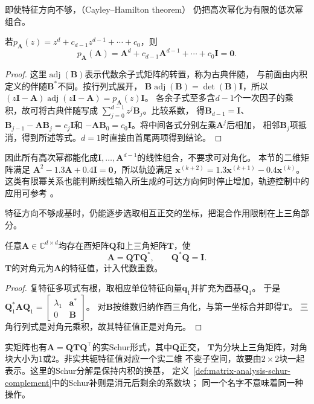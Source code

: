 即使特征方向不够，（Cayley--Hamilton theorem）
仍把高次幂化为有限的低次幂组合。
\begin{theorem}
若$p_{\bm A}(z)=z^d+c_{d-1}z^{d-1}+\cdots+c_0$，则
\[
 p_{\bm A}(\bm A)
 =\bm A^d+c_{d-1}\bm A^{d-1}+\cdots+c_0\bm I=\bm0.
\]
\end{theorem}
\begin{proof}
这里$\operatorname{adj}(\bm B)$表示代数余子式矩阵的转置，称为古典伴随，
与前面由内积定义的伴随$\bm B^*$不同。按行列式展开，
$\bm B\operatorname{adj}(\bm B)=\det(\bm B)\bm I$，所以
$(z\bm I-\bm A)\operatorname{adj}(z\bm I-\bm A)=p_{\bm A}(z)\bm I$。
各余子式至多含$d-1$个一次因子的乘积，故可将古典伴随写成
$\sum_{j=0}^{d-1}z^j\bm B_j$。比较系数，
得$\bm B_{d-1}=\bm I$、
$\bm B_{j-1}-\bm A\bm B_j=c_j\bm I$和
$-\bm A\bm B_0=c_0\bm I$。将中间各式分别左乘$\bm A^j$后相加，
相邻$\bm B_j$项抵消，得到所述等式。$d=1$时直接由首尾两项得到结论。
\end{proof}
因此所有高次幂都能化成$\bm I,\ldots,\bm A^{d-1}$的线性组合，不要求可对角化。
本节的二维矩阵满足
$\bm A^2-1.3\bm A+0.4\bm I=\bm0$，所以轨迹满足
$\bm x^{(k+2)}=1.3\bm x^{(k+1)}-0.4\bm x^{(k)}$。
这类有限幂关系也能判断线性输入所生成的可达方向何时停止增加，轨迹控制中的应用可参考
。


特征方向不够成基时，仍能逐步选取相互正交的坐标，把混合作用限制在上三角部分。
\begin{theorem}[复Schur分解]
任意$\bm A\in\mathbb C^{d\times d}$均存在酉矩阵$\bm Q$和上三角矩阵$\bm T$，使
\begin{equation}
 \bm A=\bm Q\bm T\bm Q^*,\qquad \bm Q^*\bm Q=\bm I.
 \label{eq:matrix-analysis-schur-decomposition}
\end{equation}
$\bm T$的对角元为$\bm A$的特征值，计入代数重数。
\end{theorem}
\begin{proof}
复特征多项式有根，取相应单位特征向量$\bm q_1$并扩充为酉基$\bm Q_1$。
于是$\bm Q_1^*\bm A\bm Q_1=
\left[\begin{smallmatrix}\lambda_1&\bm a^*\\0&\bm B\end{smallmatrix}\right]$。
对$\bm B$按维数归纳作酉三角化，与第一坐标合并即得$\bm T$。
三角行列式是对角元乘积，故其特征值正是对角元。
\end{proof}

实矩阵也有$\bm A=\bm Q\bm T\bm Q^\top$的实Schur形式，其中$\bm Q$正交，
$\bm T$为分块上三角矩阵，对角块大小为$1$或$2$。非实共轭特征值对应一个实二维
不变子空间，故要由$2\times2$块一起表示。这里的Schur分解是保持内积的换基，
定义~\ref{def:matrix-analysis-schur-complement}中的Schur补则是消元后剩余的系数块；
同一个名字不意味着同一种操作。

